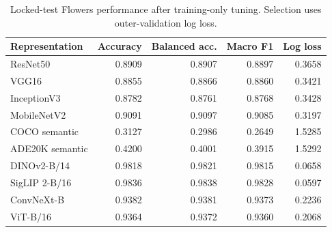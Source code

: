 \begin{table}[!htbp]
\centering\small
\caption{Locked-test Flowers performance after training-only tuning. Selection uses outer-validation log loss.}
\label{tab:flowers-performance}
\begin{tabular}{lrrrr}
\toprule
Representation & Accuracy & Balanced acc. & Macro F1 & Log loss\\
\midrule
ResNet50 & 0.8909 & 0.8907 & 0.8897 & 0.3658\\
VGG16 & 0.8855 & 0.8866 & 0.8860 & 0.3421\\
InceptionV3 & 0.8782 & 0.8761 & 0.8768 & 0.3428\\
MobileNetV2 & 0.9091 & 0.9097 & 0.9085 & 0.3197\\
COCO semantic & 0.3127 & 0.2986 & 0.2649 & 1.5285\\
ADE20K semantic & 0.4200 & 0.4001 & 0.3915 & 1.5292\\
DINOv2-B/14 & 0.9818 & 0.9821 & 0.9815 & 0.0658\\
SigLIP 2-B/16 & 0.9836 & 0.9838 & 0.9828 & 0.0597\\
ConvNeXt-B & 0.9382 & 0.9381 & 0.9373 & 0.2236\\
ViT-B/16 & 0.9364 & 0.9372 & 0.9360 & 0.2068\\
\bottomrule
\end{tabular}
\end{table}
